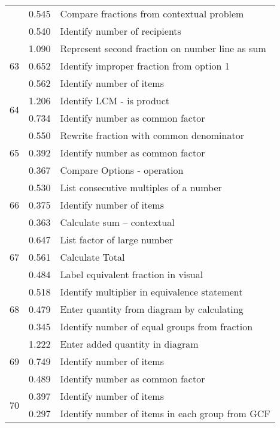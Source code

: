 \begin{longtable}[c]{|c|c|l|}
 & \small 0.545 & \small Compare fractions from contextual problem \\
 & \small 0.540 & \small Identify number of recipients \\
\hline
\multirow{3}{*}{\small 63} & \small 1.090 & \small Represent second fraction on number line as sum \\
 & \small 0.652 & \small Identify improper fraction from option 1 \\
 & \small 0.562 & \small Identify number of items \\
\hline
\multirow{2}{*}{\small 64} & \small 1.206 & \small Identify LCM - is product \\
 & \small 0.734 & \small Identify number as common factor \\
\hline
\multirow{3}{*}{\small 65} & \small 0.550 & \small Rewrite fraction with common denominator \\
 & \small 0.392 & \small Identify number as common factor \\
 & \small 0.367 & \small Compare Options - operation \\
\hline
\multirow{3}{*}{\small 66} & \small 0.530 & \small List consecutive multiples of a number \\
 & \small 0.375 & \small Identify number of items \\
 & \small 0.363 & \small Calculate sum -- contextual \\
\hline
\multirow{3}{*}{\small 67} & \small 0.647 & \small List factor of large number \\
 & \small 0.561 & \small Calculate Total \\
 & \small 0.484 & \small Label equivalent fraction in visual \\
\hline
\multirow{3}{*}{\small 68} & \small 0.518 & \small Identify multiplier in equivalence statement \\
 & \small 0.479 & \small Enter quantity from diagram by calculating \\
 & \small 0.345 & \small Identify number of equal groups from fraction \\
\hline
\multirow{3}{*}{\small 69} & \small 1.222 & \small Enter added quantity in diagram \\
 & \small 0.749 & \small Identify number of items \\
 & \small 0.489 & \small Identify number as common factor \\
\hline
\multirow{3}{*}{\small 70} & \small 0.397 & \small Identify number of items \\
 & \small 0.297 & \small Identify number of items in each group from GCF \\

\end{longtable}
